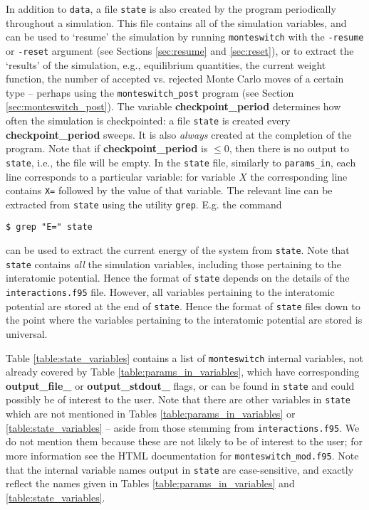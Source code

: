 \documentclass{report}
\begin{document}
In addition to \texttt{data}, a file \texttt{state} is also created by the program periodically throughout a simulation. This file contains all of the 
simulation variables, and can be used to `resume' the simulation by running \texttt{monteswitch} with the \texttt{-resume} or \texttt{-reset} argument
(see Sections \ref{sec:resume} and \ref{sec:reset}), or to extract the `results' of the simulation, e.g., equilibrium quantities, the current weight 
function, the number of accepted vs. rejected Monte Carlo moves of a certain type -- perhaps using the \texttt{monteswitch\_post} program 
(see Section \ref{sec:monteswitch_post}).
The variable \textbf{checkpoint\_period} determines how often the simulation is checkpointed: a file \texttt{state} is created every 
\textbf{checkpoint\_period} sweeps. It is also \emph{always} created at the completion of the program. Note that if \textbf{checkpoint\_period} is $\leq 0$, 
then there is no output to \texttt{state}, i.e., the file will be empty.
In the \texttt{state} file, similarly to \texttt{params\_in}, each line corresponds to a particular variable: for variable $X$ the corresponding line contains
\texttt{X=} followed by the value of that variable. The relevant line can be extracted from \texttt{state} using the utility \texttt{grep}. E.g. the command
\begin{verbatim}
$ grep "E=" state
\end{verbatim}
can be used to extract the current energy of the system from \texttt{state}.
Note that \texttt{state} contains \emph{all} the simulation variables, including those
pertaining to the interatomic potential. Hence the format of \texttt{state} depends on the details of the \texttt{interactions.f95} file. However,
all variables pertaining to the interatomic potential are stored at the end of \texttt{state}. Hence the format of \texttt{state} files down to the
point where the variables pertaining to the interatomic potential are stored is universal.

Table \ref{table:state_variables} contains a list of \texttt{monteswitch} internal variables, not already covered by Table \ref{table:params_in_variables},
which have corresponding \textbf{output\_file\_} or \textbf{output\_stdout\_} flags, or can be found in \texttt{state} and could possibly be of interest
to the user. Note that there are other variables in \texttt{state} which are not mentioned in Tables \ref{table:params_in_variables} or 
\ref{table:state_variables} -- aside from those stemming from \texttt{interactions.f95}. We do not mention them because these are not likely to be of
interest to the user; for more information see the HTML documentation for \texttt{monteswitch\_mod.f95}.
Note that the internal variable names output in \texttt{state} are case-sensitive, and exactly reflect the names given in Tables 
\ref{table:params_in_variables} and \ref{table:state_variables}.
\end{document}
